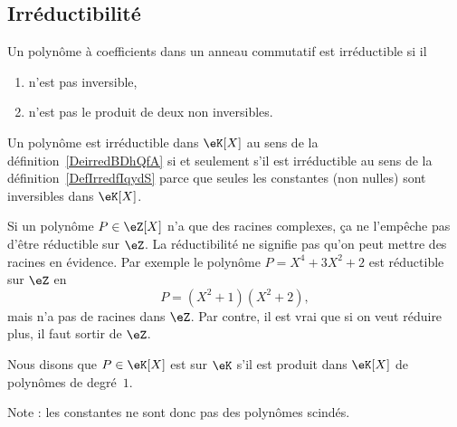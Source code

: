 \subsection{Irréductibilité}

\begin{definition}      \label{DefIrredfIqydS}
    Un polynôme à coefficients dans un anneau commutatif est irréductible si il
\begin{enumerate}
        \item
            n'est pas inversible,
        \item
            n'est pas le produit de deux non inversibles.
    \end{enumerate}
\end{definition}

    Un polynôme est irréductible dans \( \eK[X]\) au sens de la définition~\ref{DeirredBDhQfA} si et seulement s'il est irréductible au sens de la définition~\ref{DefIrredfIqydS} parce que seules les constantes (non nulles) sont inversibles dans \( \eK[X]\).

\begin{example}
    Si un polynôme \( P\in \eZ[X]\) n'a que des racines complexes, ça ne l'empêche pas d'être réductible sur \( \eZ\). La réductibilité ne signifie pas qu'on peut mettre des racines en évidence. Par exemple le polynôme \( P=X^4+3X^2+2\) est réductible sur \( \eZ\) en
    \begin{equation}
        P=(X^2+1)(X^2+2),
    \end{equation}
    mais n'a pas de racines dans \( \eZ\). Par contre, il est vrai que si on veut réduire plus, il faut sortir de \( \eZ\).

\end{example}

\begin{definition}  \label{DefCPLSooQaHJKQ}
    Nous disons que \( P\in\eK[X]\) est  sur \(\eK\) s'il est produit dans \(\eK[X]\) de polynômes de degré~\( 1\).
\end{definition}
Note : les constantes ne sont donc pas des polynômes scindés.

